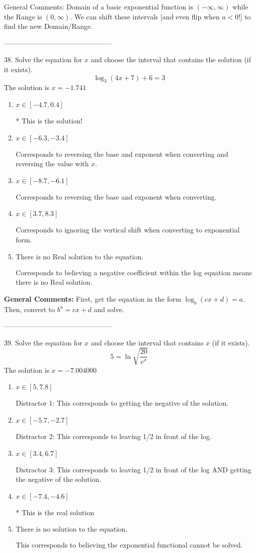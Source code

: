 \documentclass{article}[10pt]
\begin{document}
General Comments: Domain of a basic exponential function is $(-\infty, \infty)$ while the Range is $(0, \infty)$. We can shift these intervals [and even flip when $a<0$!] to find the new Domain/Range.

-----------------------------------------------

38. Solve the equation for $x$ and choose the interval that contains the solution (if it exists).
$$ \log_{3}{(4x+7)}+6 = 3 $$ 
The solution is $ x = -1.741 $ 

\begin{enumerate}[label=\Alph*.] 
\item $ x \in [-4.7, 0.4] $ 

 * This is the solution! 
\item $ x \in [-6.3, -3.4] $ 

  Corresponds to reversing the base and exponent when converting and reversing the value with $x$. 
\item $ x \in [-8.7, -6.1] $ 

  Corresponds to reversing the base and exponent when converting. 
\item $ x \in [3.7, 8.3] $ 

  Corresponds to ignoring the vertical shift when converting to exponential form. 
\item $ \text{There is no Real solution to the equation.} $ 

  Corresponds to believing a negative coefficient within the log equation means there is no Real solution. 
\end{enumerate} 
 
\textbf{General Comments:} First, get the equation in the form $\log_b{(cx+d)} = a$. Then, convert to $b^a = cx+d$ and solve.

-----------------------------------------------

39.  Solve the equation for $x$ and choose the interval that contains $x$ (if it exists).
$$  5 = \ln{\sqrt{\frac{20}{e^x}}} $$ 
The solution is $ x = -7.004000 $ 

\begin{enumerate}[label=\Alph*.] 
\item $ x \in [5,7.8] $ 

  Distractor 1: This corresponds to getting the negative of the solution. 
\item $ x \in [-5.7,-2.7] $ 

  Distractor 2: This corresponds to leaving 1/2 in front of the log. 
\item $ x \in [3.4,6.7] $ 

  Distractor 3: This corresponds to leaving 1/2 in front of the log AND getting the negative of the solution. 
\item $ x \in [-7.4,-4.6] $ 

 * This is the real solution 
\item $ \text{There is no solution to the equation.} $ 

 This corresponds to believing the exponential functional cannot be solved. 
\end{enumerate} 
 
\end{document}
